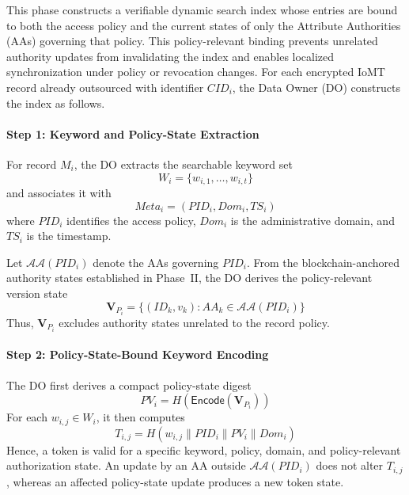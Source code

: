 \documentclass{ieeetj}
\theoremstyle{ieee-style}
\begin{document}
This phase constructs a verifiable dynamic search index whose entries are
bound to both the access policy and the current states of only the
Attribute Authorities (AAs) governing that policy. This policy-relevant
binding prevents unrelated authority updates from invalidating the index
and enables localized synchronization under policy or revocation changes.
For each encrypted IoMT record already outsourced with identifier $CID_i$,
the Data Owner (DO) constructs the index as follows.

\paragraph*{Step 1: Keyword and Policy-State Extraction}

For record $M_i$, the DO extracts the searchable keyword set
\begin{equation}
W_i=\{w_{i,1},\ldots,w_{i,t}\}
\end{equation}
and associates it with
\begin{equation}
Meta_i=(PID_i,Dom_i,TS_i)
\end{equation}
where $PID_i$ identifies the access policy, $Dom_i$ is the administrative
domain, and $TS_i$ is the timestamp.

Let $\mathcal{AA}(PID_i)$ denote the AAs governing $PID_i$. From the
blockchain-anchored authority states established in Phase~II, the DO
derives the policy-relevant version state
\begin{equation}
\mathbf{V}_{P_i}
=
\{(ID_k,v_k):AA_k\in\mathcal{AA}(PID_i)\}
\label{eq:policy-version-state}
\end{equation}
Thus, $\mathbf{V}_{P_i}$ excludes authority states unrelated to the
record policy.

\paragraph*{Step 2: Policy-State-Bound Keyword Encoding}

The DO first derives a compact policy-state digest
\begin{equation}
PV_i=
H\!\left(
\mathsf{Encode}(\mathbf{V}_{P_i})
\right)
\label{eq:policy-version-digest}
\end{equation}
For each $w_{i,j}\in W_i$, it then computes
\begin{equation}
T_{i,j}
=
H\!\left(
w_{i,j}
\parallel PID_i
\parallel PV_i
\parallel Dom_i
\right)
\label{eq:policy-bound-token}
\end{equation}
Hence, a token is valid for a specific keyword, policy, domain, and
policy-relevant authorization state. An update by an AA outside
$\mathcal{AA}(PID_i)$ does not alter $T_{i,j}$, whereas an affected
policy-state update produces a new token state.
\end{document}
